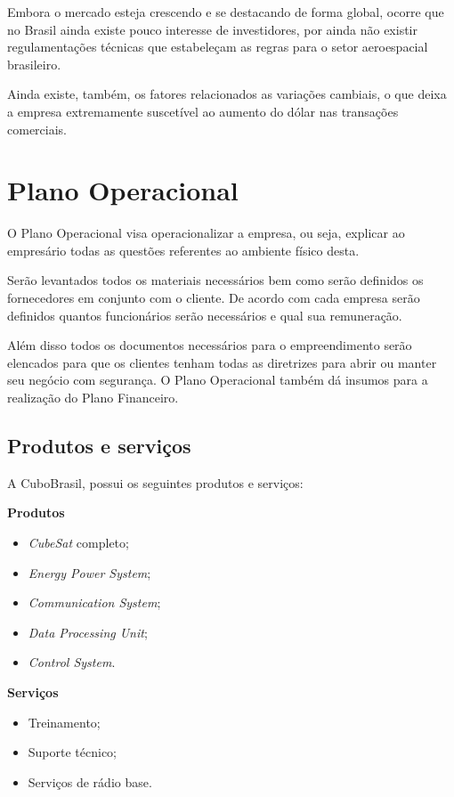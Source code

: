 \documentclass[
	12pt,				%
	openright,			%
	oneside,			%
	a4paper,			%
	english,			%
	french,				%
	spanish,			%
	brazil				%
	]{abntex2}
\begin{document}
	Embora o mercado esteja crescendo e se destacando de forma global, ocorre que no Brasil ainda existe pouco interesse de investidores, por ainda não existir regulamentações técnicas que estabeleçam as regras para o setor aeroespacial brasileiro.
	
	Ainda existe, também, os fatores relacionados as variações cambiais, o que deixa a empresa extremamente suscetível ao aumento do dólar nas transações comerciais.
	
\chapter[Plano Operacional]{Plano Operacional}

	O Plano Operacional visa operacionalizar a empresa, ou seja, explicar ao empresário todas as questões referentes ao ambiente físico desta.
 
	Serão levantados todos os materiais necessários bem como serão definidos os fornecedores em conjunto com o cliente. De acordo com cada empresa serão definidos quantos funcionários serão necessários e qual sua remuneração.
 
	Além disso todos os documentos necessários para o empreendimento serão elencados para que os clientes tenham todas as diretrizes para abrir ou manter seu negócio com segurança. O Plano Operacional também dá insumos para a realização do Plano Financeiro.

\section[Produtos e serviços]{Produtos e serviços}

	A CuboBrasil, possui os seguintes produtos e serviços:
	

	\textbf{Produtos}
	
	\begin{itemize}
		\item \textit{CubeSat} completo;
		\item \textit{Energy Power System};
		\item \textit{Communication System};
		\item \textit{Data Processing Unit};
		\item \textit{Control System}.
	\end{itemize}

	\textbf{Serviços}
	
	\begin{itemize}
		\item Treinamento;
		\item Suporte técnico;
		\item Serviços de rádio base.
	\end{itemize}
\end{document}
